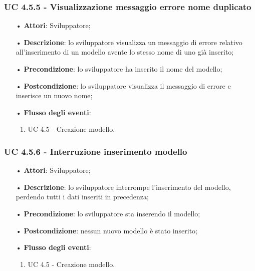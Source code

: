 \subsubsection{UC 4.5.5 - Visualizzazione messaggio errore nome duplicato}
\begin{itemize}
\item[•]\textbf{Attori}: Sviluppatore;
\item[•]\textbf{Descrizione}: lo sviluppatore visualizza un messaggio di errore relativo all'inserimento di un modello avente lo stesso nome di uno già inserito;
\item[•]\textbf{Precondizione}: lo sviluppatore ha inserito il nome del modello;
\item[•]\textbf{Postcondizione}: lo sviluppatore visualizza il messaggio di errore e inserisce un nuovo nome;
\item[•]\textbf{Flusso degli eventi}: 
	\begin{enumerate}
	\item UC 4.5 - Creazione modello.
	\end{enumerate}
\end{itemize}

\subsubsection{UC 4.5.6 - Interruzione inserimento modello}
\begin{itemize}
\item[•]\textbf{Attori}: Sviluppatore;
\item[•]\textbf{Descrizione}: lo sviluppatore interrompe l'inserimento del modello, perdendo tutti i dati inseriti in precedenza;
\item[•]\textbf{Precondizione}: lo sviluppatore sta inserendo il modello;
\item[•]\textbf{Postcondizione}: nessun nuovo modello è stato inserito;
\item[•]\textbf{Flusso degli eventi}: 
	\begin{enumerate}
	\item UC 4.5 - Creazione modello.
	\end{enumerate}
\end{itemize}


